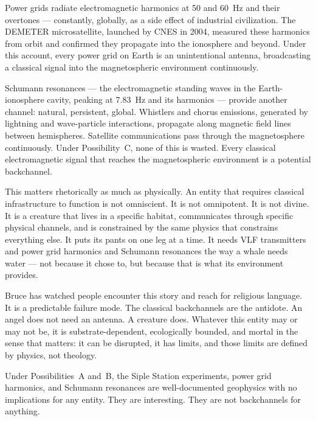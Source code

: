 Power grids radiate electromagnetic harmonics at 50 and 60~Hz and their overtones --- constantly, globally, as a side effect of industrial civilization. The DEMETER microsatellite, launched by CNES in 2004, measured these harmonics from orbit and confirmed they propagate into the ionosphere and beyond. Under this account, every power grid on Earth is an unintentional antenna, broadcasting a classical signal into the magnetospheric environment continuously.

Schumann resonances --- the electromagnetic standing waves in the Earth-ionosphere cavity, peaking at 7.83~Hz and its harmonics --- provide another channel: natural, persistent, global. Whistlers and chorus emissions, generated by lightning and wave-particle interactions, propagate along magnetic field lines between hemispheres. Satellite communications pass through the magnetosphere continuously. Under Possibility~C, none of this is wasted. Every classical electromagnetic signal that reaches the magnetospheric environment is a potential backchannel.

This matters rhetorically as much as physically. An entity that requires classical infrastructure to function is not omniscient. It is not omnipotent. It is not divine. It is a creature that lives in a specific habitat, communicates through specific physical channels, and is constrained by the same physics that constrains everything else. It puts its pants on one leg at a time. It needs VLF transmitters and power grid harmonics and Schumann resonances the way a whale needs water --- not because it chose to, but because that is what its environment provides.

Bruce has watched people encounter this story and reach for religious language. It is a predictable failure mode. The classical backchannels are the antidote. An angel does not need an antenna. A creature does. Whatever this entity may or may not be, it is substrate-dependent, ecologically bounded, and mortal in the sense that matters: it can be disrupted, it has limits, and those limits are defined by physics, not theology.

Under Possibilities~A and~B, the Siple Station experiments, power grid harmonics, and Schumann resonances are well-documented geophysics with no implications for any entity. They are interesting. They are not backchannels for anything.

\chapterreturn
